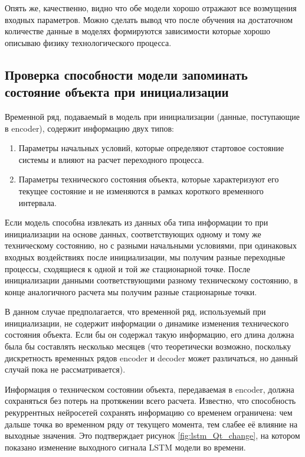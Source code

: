 \documentclass[12pt,a4paper]{article}
\begin{document}
Опять же, качественно, видно что обе модели хорошо отражают все возмущения входных параметров. Можно сделать вывод что после обучения на достаточном количестве данные в моделях формируются зависимости которые хорошо описываю физику технологического процесса.

\newpage
\subsection{Проверка способности модели запоминать состояние объекта при инициализации}

Временной ряд, подаваемый в модель при инициализации (данные, поступающие в encoder), содержит информацию двух типов:

\begin{enumerate}
	\item Параметры начальных условий, которые определяют стартовое состояние системы и влияют на расчет переходного процесса.
	\item Параметры технического состояния объекта, которые характеризуют его текущее состояние и не изменяются в рамках короткого временного интервала.
\end{enumerate}

Если модель способна извлекать из данных оба типа информации то при инициализации на основе данных, соответствующих одному и тому же техническому состоянию, но с разными начальными условиями, при одинаковых входных воздействиях после инициализации, мы получим разные переходные процессы, сходящиеся к одной и той же стационарной точке. После инициализации данными  соответствующими разному техническому состоянию, в конце аналогичного расчета мы получим разные стационарные точки.

В данном случае предполагается, что временной ряд, используемый при инициализации, не содержит информации о динамике изменения технического состояния объекта. Если бы он содержал такую информацию, его длина должна была бы составлять несколько месяцев (что теоретически возможно, поскольку дискретность временных рядов encoder и decoder может различаться, но данный случай пока не рассматривается).

Информация о техническом состоянии объекта, передаваемая в encoder, должна сохраняться без потерь на протяжении всего расчета. Известно, что способность рекуррентных нейросетей сохранять информацию со временем ограничена: чем дальше точка во временном ряду от текущего момента, тем слабее её влияние на выходные значения. Это подтверждает рисунок \ref{fig:lstm_Qt_change}, на котором показано изменение выходного сигнала LSTM модели во времени.
\end{document}
